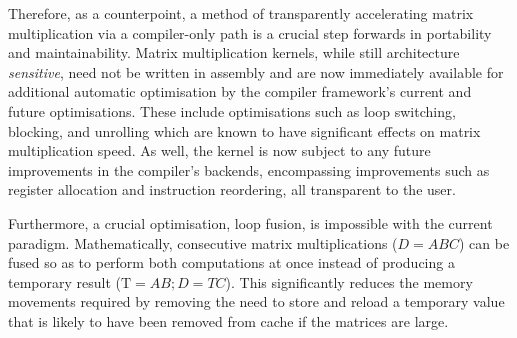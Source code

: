 \documentclass[\main/thesis.tex]{subfiles}
\begin{document}
Therefore, as a counterpoint, a method of transparently accelerating matrix multiplication via a compiler-only path is a crucial step forwards in portability and maintainability.
Matrix multiplication kernels, while still architecture \emph{sensitive}\footnotemark, need not be written in assembly and are now immediately available for additional automatic optimisation by the compiler framework's current and future optimisations.
These include optimisations such as loop switching, blocking, and unrolling which are known to have significant effects on matrix multiplication speed.
As well, the kernel is now subject to any future improvements in the compiler's backends, encompassing improvements such as register allocation and instruction reordering, all transparent to the user.

Furthermore, a crucial optimisation, loop fusion, is impossible with the current paradigm.
Mathematically, consecutive matrix multiplications (\eg $D = ABC$) can be fused so as to perform both computations at once instead of producing a temporary result (\ie $\text{T}=AB;D=TC$).
This significantly reduces the memory movements required by removing the need to store and reload a temporary value that is likely to have been removed from cache if the matrices are large.

\end{document}
